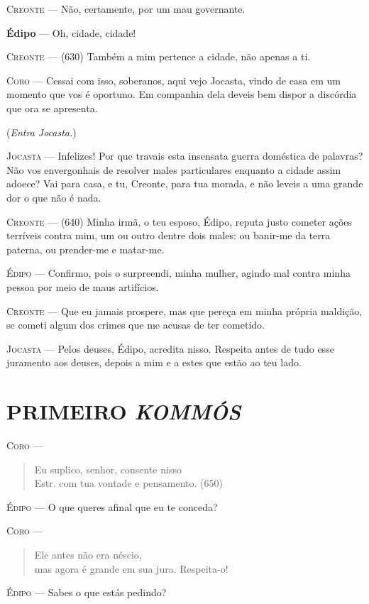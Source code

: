 \textsc{Creonte} --- Não, certamente, por um mau governante.

\textbf{Édipo} --- Oh, cidade, cidade!

\textsc{Creonte} --- (630) Também a mim pertence a cidade, não apenas a ti.

\textsc{Coro} --- Cessai com isso, soberanos, aqui vejo Jocasta, vindo de casa em um
momento que vos é oportuno. Em companhia dela deveis bem dispor a
discórdia que ora se apresenta.

(\emph{Entra Jocasta.})

\textsc{Jocasta} --- Infelizes! Por que travais esta insensata guerra doméstica de palavras?
Não vos envergonhais de resolver males particulares enquanto a cidade
assim adoece? Vai para casa, e tu, Creonte, para tua morada, e não
leveis a uma grande dor o que não é nada.

\textsc{Creonte} --- (640) Minha irmã, o teu esposo, Édipo, reputa justo cometer ações
terríveis contra mim, um ou outro dentre dois males: ou banir-me da
terra paterna, ou prender-me e matar-me.

\textsc{Édipo} --- Confirmo, pois o surpreendi, minha mulher, agindo mal contra minha
pessoa por meio de maus artifícios.

\textsc{Creonte} --- Que eu jamais prospere, mas que pereça em minha própria maldição, se
cometi algum dos crimes que me acusas de ter cometido.

\textsc{Jocasta} --- Pelos deuses, Édipo, acredita nisso. Respeita antes de tudo esse
juramento aos deuses, depois a mim e a estes que estão ao teu lado.

\section{PRIMEIRO \emph{KOMMÓS}}

\textsc{Coro} --- \begin{verse}Eu suplico, senhor, consente nisso\\ Estr.
com tua vontade e pensamento. (650)
\end{verse}

\textsc{Édipo} --- O que queres afinal que eu te conceda?

\textsc{Coro} --- \begin{verse}Ele antes não era néscio,\\
mas agora é grande em sua jura. Respeita-o!
\end{verse}

\textsc{Édipo} --- Sabes o que estás pedindo?

